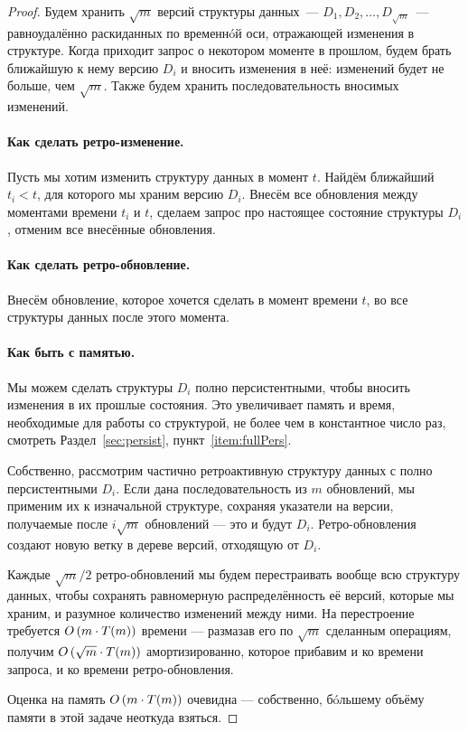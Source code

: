 \begin{proof}
	Будем хранить $\sqrt{m}$ версий структуры данных~— $D_1, D_2, \ldots, D_{\sqrt{m}}$~— равноудалённо раскиданных по временн\'oй оси, отражающей изменения в структуре. Когда приходит запрос о некотором моменте в прошлом, будем брать ближайшую к нему версию $D_i$ и вносить изменения в неё: изменений будет не больше, чем $\sqrt{m}$. Также будем хранить последовательность вносимых изменений.

	\paragraph{Как сделать ретро-изменение.} Пусть мы хотим изменить структуру данных в момент $t$. Найдём ближайший $t_i < t$, для которого мы храним версию $D_i$. Внесём все обновления между моментами времени $t_i$ и $t$, сделаем запрос про настоящее состояние структуры $D_i$, отменим все внесённые обновления.

	\paragraph{Как сделать ретро-обновление.} Внесём обновление, которое хочется сделать в момент времени $t$, во все структуры данных после этого момента.

	\paragraph{Как быть с памятью.} Мы можем сделать структуры $D_i$ полно персистентными, чтобы вносить изменения в их прошлые состояния.  Это увеличивает память и время, необходимые для работы со структурой, не более чем в константное число раз, смотреть Раздел~\ref{sec:persist}, пункт~\ref{item:fullPers}.
	
	Собственно, рассмотрим частично ретроактивную структуру данных с полно персистентными $D_i$. Если дана последовательность из $m$ обновлений, мы применим их к изначальной структуре, сохраняя указатели на версии, получаемые после $i \sqrt{m}$ обновлений — это и будут $D_i$. Ретро-обновления создают новую ветку в дереве версий, отходящую от $D_i$.
	
	Каждые $\sqrt{m} / 2$ ретро-обновлений мы будем перестраивать вообще всю структуру данных, чтобы сохранять равномерную распределённость её версий, которые мы храним, и разумное количество изменений между ними. На перестроение требуется $O \left( m \cdot T(m) \right)$ времени — размазав его по $\sqrt{m}$ сделанным операциям, получим $O \left( \sqrt{m} \cdot T(m) \right)$ амортизированно, которое прибавим и ко времени запроса, и ко времени ретро-обновления.
	
	Оценка на память $O \left( m \cdot T(m) \right)$ очевидна — собственно, б\'oльшему объёму памяти в этой задаче неоткуда взяться.
\end{proof}

